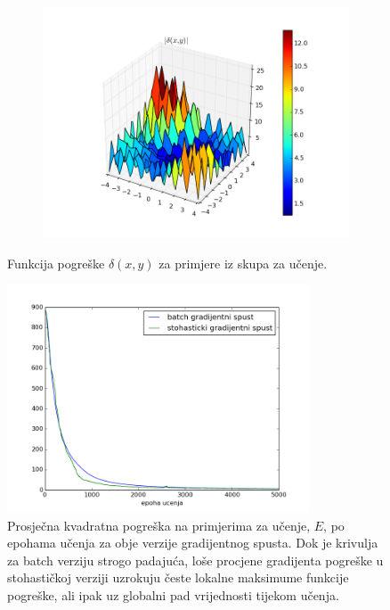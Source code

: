 \documentclass[paper=a4, fontsize=11pt]{scrartcl} %
\numberwithin{equation}{section} %
\numberwithin{figure}{section} %
\numberwithin{table}{section} %
\begin{document}
\begin{figure}[h]
\begin{subfigure}[b]{0.5\textwidth}
\includegraphics[width=\textwidth]{img/figure_zad6_3.png}
\end{subfigure}
\caption{Funkcija pogreške $\delta(x, y)$ za primjere iz skupa za učenje. }
\end{figure} 

\begin{figure}[h]
\centering
\includegraphics[width=0.8\textwidth]{img/figure_zad7.png}
\caption{Prosječna kvadratna pogreška na primjerima za učenje, $E$, po epohama učenja za obje verzije gradijentnog spusta. Dok je krivulja za batch verziju strogo padajuća, loše procjene gradijenta pogreške u stohastičkoj verziji uzrokuju česte lokalne maksimume funkcije pogreške, ali ipak uz globalni pad vrijednosti tijekom učenja.}
\end{figure}
\end{document}
